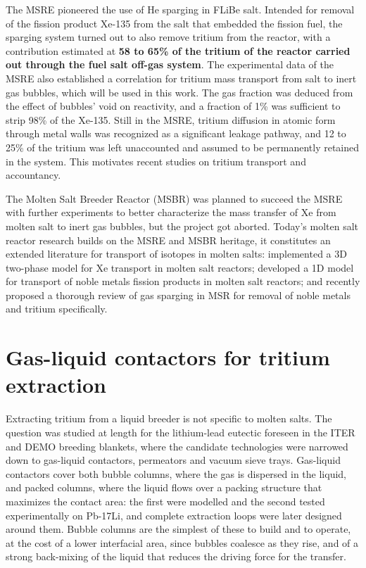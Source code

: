 \documentclass[a4paper,11pt,oneside]{report}
\begin{document}
The MSRE pioneered the use of He sparging in FLiBe salt. Intended for removal of the fission product Xe-135 from the salt that embedded the fission fuel, the sparging system turned out to also remove tritium from the reactor, with a contribution estimated at \textbf{58 to 65\% of the tritium of the reactor carried out through the fuel salt off-gas system}\cite{briggs_calculation_1970}. The experimental data of the MSRE also established a correlation for tritium mass transport from salt to inert gas bubbles, which will be used in this work. The gas fraction was deduced from the effect of bubbles' void on reactivity, and a fraction of 1\% was sufficient to strip 98\% of the Xe-135\cite{evans_physics_2026}. Still in the MSRE, tritium diffusion in atomic form through metal walls was recognized as a significant leakage pathway\cite{robertson_conceptual_1971}, and 12 to 25\% of the tritium was left unaccounted and assumed to be permanently retained in the system\cite{briggs_calculation_1970}. This motivates recent studies on tritium transport and accountancy. 

The Molten Salt Breeder Reactor (MSBR) was planned to succeed the MSRE with further experiments to better characterize the mass transfer of Xe from molten salt to inert gas bubbles\cite{peebles_removal_1968}, but the project got aborted. Today's molten salt reactor research builds on the MSRE and MSBR heritage, it constitutes an extended literature for transport of isotopes in molten salts: \textcite{taylor_implementation_2022} implemented a 3D two-phase model for Xe transport in molten salt reactors; \textcite{yang_multiphase_2025} developed a 1D model for transport of noble metals fission products in molten salt reactors; and \textcite{evans_physics_2026} recently proposed a thorough review of gas sparging in MSR for removal of noble metals and tritium specifically. 

\section{Gas-liquid contactors for tritium extraction}

Extracting tritium from a liquid breeder is not specific to molten salts. The question was studied at length for the lithium-lead eutectic foreseen in the ITER and DEMO breeding blankets, where the candidate technologies were narrowed down to gas-liquid contactors, permeators and vacuum sieve trays\cite{ricapito_tritium_2011}. Gas-liquid contactors cover both bubble columns, where the gas is dispersed in the liquid, and packed columns, where the liquid flows over a packing structure that maximizes the contact area: the first were modelled and the second tested experimentally on Pb-17Li\cite{malara_tritium_1995,alpy_hydrogen_1998}, and complete extraction loops were later designed around them\cite{mohan_experimental_2010}. Bubble columns are the simplest of these to build and to operate, at the cost of a lower interfacial area, since bubbles coalesce as they rise, and of a strong back-mixing of the liquid that reduces the driving force for the transfer\cite{ricapito_tritium_2011}.
\end{document}
